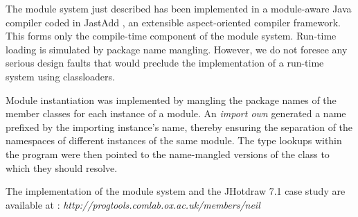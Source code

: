 The module system just described has been implemented in a
module-aware Java compiler coded in JastAdd \cite{jastadd},
an extensible aspect-oriented compiler framework. This forms
only the compile-time component of the module system. Run-time
loading is simulated by package name mangling. However,
we do not foresee any serious design faults that would preclude
the implementation of a run-time system using classloaders.

Module instantiation was implemented by mangling
the package names of the member classes for each instance of 
a module. An \textit{import own} generated a name prefixed by 
the importing instance's name, thereby ensuring the separation
of the namespaces of different instances of the same module.
The type lookups within the program were then pointed to the
name-mangled versions of the class to which they should resolve.

The implementation of the module system and the 
JHotdraw 7.1 case study are available at : 
\textit{http://progtools.comlab.ox.ac.uk/members/neil}


